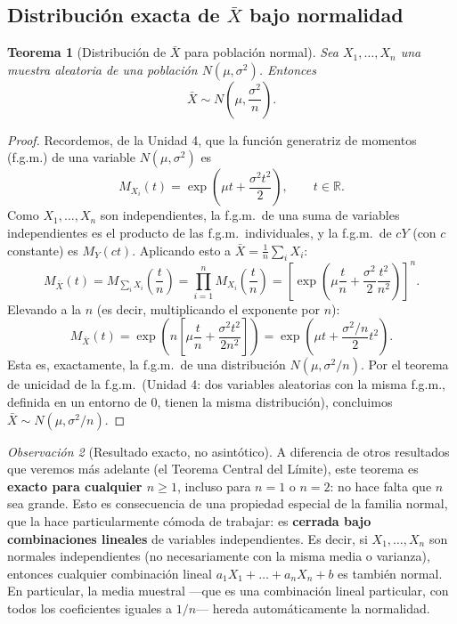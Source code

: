 \documentclass[11pt,a4paper]{article}
\theoremstyle{plain}
\newtheorem{teorema}{Teorema}[section]
\theoremstyle{definition}
\theoremstyle{remark}
\newtheorem{observacion}[teorema]{Observación}
\begin{document}
\subsection{Distribución exacta de $\bar X$ bajo normalidad}

\begin{teorema}[Distribución de $\bar X$ para población normal]
\label{teo:xbarra-normal}
Sea $X_1,\dots,X_n$ una muestra aleatoria de una población $N(\mu,\sigma^2)$. Entonces
$$\bar X \sim N\!\left(\mu, \frac{\sigma^2}{n}\right).$$
\end{teorema}

\begin{proof}
Recordemos, de la Unidad 4, que la función generatriz de momentos (f.g.m.) de una variable $N(\mu,\sigma^2)$ es
$$M_{X_i}(t) = \exp\left(\mu t + \frac{\sigma^2 t^2}{2}\right), \qquad t\in\mathbb{R}.$$
Como $X_1,\dots,X_n$ son independientes, la f.g.m.\ de una suma de variables independientes es el producto de las f.g.m.\ individuales, y la f.g.m.\ de $cY$ (con $c$ constante) es $M_Y(ct)$. Aplicando esto a $\bar X = \frac{1}{n}\sum_i X_i$:
$$M_{\bar X}(t) = M_{\sum_i X_i}\!\left(\frac{t}{n}\right) = \prod_{i=1}^n M_{X_i}\!\left(\frac{t}{n}\right) = \left[\exp\left(\mu \frac{t}{n} + \frac{\sigma^2}{2}\frac{t^2}{n^2}\right)\right]^n.$$
Elevando a la $n$ (es decir, multiplicando el exponente por $n$):
$$M_{\bar X}(t) = \exp\left(n\left[\mu\frac{t}{n}+\frac{\sigma^2 t^2}{2n^2}\right]\right) = \exp\left(\mu t + \frac{\sigma^2/n}{2}t^2\right).$$
Esta es, exactamente, la f.g.m.\ de una distribución $N(\mu,\sigma^2/n)$. Por el teorema de unicidad de la f.g.m.\ (Unidad 4: dos variables aleatorias con la misma f.g.m., definida en un entorno de $0$, tienen la misma distribución), concluimos $\bar X\sim N(\mu,\sigma^2/n)$. \qedhere
\end{proof}

\begin{observacion}[Resultado exacto, no asintótico]
A diferencia de otros resultados que veremos más adelante (el Teorema Central del Límite), este teorema es \textbf{exacto para cualquier $n\geq 1$}, incluso para $n=1$ o $n=2$: no hace falta que $n$ sea grande. Esto es consecuencia de una propiedad especial de la familia normal, que la hace particularmente cómoda de trabajar: es \textbf{cerrada bajo combinaciones lineales} de variables independientes. Es decir, si $X_1,\dots,X_n$ son normales independientes (no necesariamente con la misma media o varianza), entonces cualquier combinación lineal $a_1X_1+\dots+a_nX_n+b$ es también normal. En particular, la media muestral —que es una combinación lineal particular, con todos los coeficientes iguales a $1/n$— hereda automáticamente la normalidad.
\end{observacion}
\end{document}
